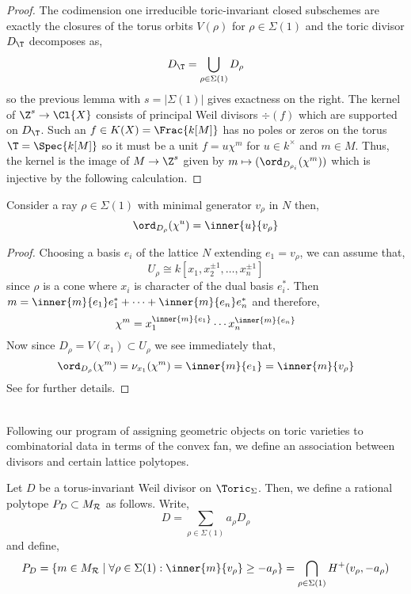 \begin{proof}
The codimension one irreducible toric-invariant closed subschemes are exactly the closures of the torus orbits $V(\rho)$ for $\rho \in \Sigma(1)$ and the toric divisor $D_\T$ decomposes as,
\[ D_\T = \bigcup_{\rho \in \Sigma(1)} D_\rho \]
so the previous lemma with $s = |\Sigma(1)|$ gives exactness on the right. The kernel of $\Z^s \to \Cl{X}$ consists of principal Weil divisors $\div{(f)}$ which are supported on $D_\T$. Such an $f \in K(X) = \Frac{k[M]}$ has no poles or zeros on the torus $\T = \Spec{k[M]}$ so it must be a unit $f = u \chi^m$ for $u \in k^\times$ and $m \in M$. Thus, the kernel is the image of $M \to \Z^s$ given by $m \mapsto (\ord_{D_{\rho_i}}(\chi^m))$ which is injective by the following calculation.
\end{proof}

\begin{lemma} \label{order_formula}
Consider a ray $\rho \in \Sigma(1)$ with minimal generator $v_\rho$ in $N$ then,
\[ \ord_{D_\rho}(\chi^u) = \inner{u}{v_\rho} \]
\end{lemma}

\begin{proof}
Choosing a basis $e_i$ of the lattice $N$ extending $e_1 = v_\rho$, we can assume that,
\[ U_\rho \cong k[x_1, x_2^{\pm 1}, \dots, x_n^{\pm 1}] \]
since $\rho$ is a cone where $x_i$ is character of the dual basis $e_i^*$. Then $m = \inner{m}{e_1} e_1^* + \cdots + \inner{m}{e_n} e_n^*$ and therefore,
\[ \chi^m = x_1^{\inner{m}{e_1}} \cdots x_n^{\inner{m}{e_n}} \]
Now since $D_\rho = V(x_1) \subset U_\rho$ we see immediately that,
\[ \ord_{D_\rho}{(\chi^m)} = \nu_{x_1}(\chi^m) = \inner{m}{e_1} = \inner{m}{v_\rho} \]
See \cite[Prop. 4.1.1]{cox} for further details.
\end{proof}
\noindent\\
Following our program of assigning geometric objects on toric varieties to combinatorial data in terms of the convex fan, we define an association between divisors and certain lattice polytopes. 

\begin{defn}
Let $D$ be a torus-invariant Weil divisor on $\Toric_\Sigma$. Then, we define a rational polytope $P_D \subset M_{\mathcal{R}}$ as follows. Write,
\[ D = \sum_{\rho \in \Sigma(1)} a_\rho D_\rho \]
and define,
\[ P_D = \{ m \in M_\R \mid \forall \rho \in \Sigma(1) : \inner{m}{v_\rho} \ge - a_\rho \} = \bigcap_{\rho \in \Sigma(1)} H^+(v_\rho, -a_\rho) \]
\end{defn}


